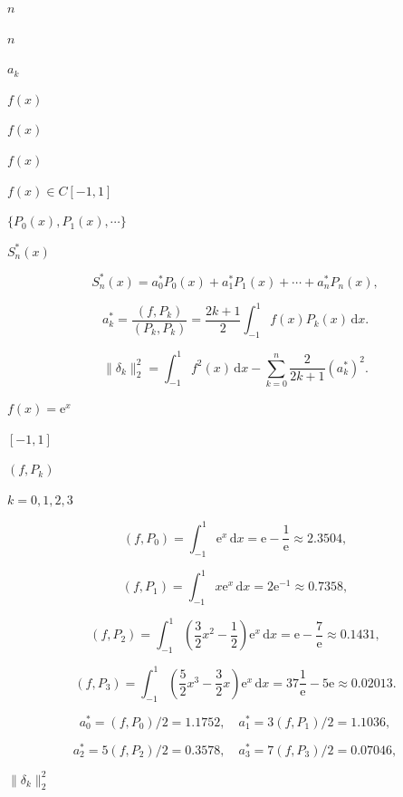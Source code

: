 \documentclass[UTF8,fontset=fandol,a4paper]{ctexart}
\begin{document}
\noindent $n$\par

\noindent $n$\par

\noindent $a_k$\par

\noindent $f(x)$\par

\noindent $f(x)$\par

\noindent $f(x)$\par

\noindent $f(x)\in C[-1,1]$\par

\noindent $\{P_0(x),P_1(x),\cdots\}$\par

\noindent $S_n^*(x)$\par

\[
S_n^*(x)=a_0^*P_0(x)+a_1^*P_1(x)+\cdots+a_n^*P_n(x),\tag{3.5.6}
\]

\[
a_k^*=\frac{(f,P_k)}{(P_k,P_k)}=\frac{2k+1}{2}\int_{-1}^1f(x)P_k(x)\,\mathrm dx.\tag{3.5.7}
\]

\[
\|\delta_k\|_2^2=\int_{-1}^1 f^2(x)\,\mathrm dx-\sum_{k=0}^n\frac{2}{2k+1}(a_k^*)^2.\tag{3.5.8}
\]

\noindent $f(x)=\mathrm e^x$\par

\noindent $[-1,1]$\par

\noindent $(f,P_k)$\par

\noindent $k=0,1,2,3$\par

\[
(f,P_0)=\int_{-1}^1\mathrm e^x\,\mathrm dx=\mathrm e-\frac1{\mathrm e}\approx2.3504,
\]

\[
(f,P_1)=\int_{-1}^1x\mathrm e^x\,\mathrm dx=2\mathrm e^{-1}\approx0.7358,
\]

\[
(f,P_2)=\int_{-1}^1\left(\frac32x^2-\frac12\right)\mathrm e^x\,\mathrm dx=\mathrm e-\frac7{\mathrm e}\approx0.1431,
\]

\[
(f,P_3)=\int_{-1}^1\left(\frac52x^3-\frac32x\right)\mathrm e^x\,\mathrm dx=37\frac1{\mathrm e}-5\mathrm e\approx0.02013.
\]

\[
a_0^*=(f,P_0)/2=1.1752,\quad a_1^*=3(f,P_1)/2=1.1036,
\]

\[
a_2^*=5(f,P_2)/2=0.3578,\quad a_3^*=7(f,P_3)/2=0.07046,
\]

\noindent $\|\delta_k\|_2^2$\par
\end{document}
